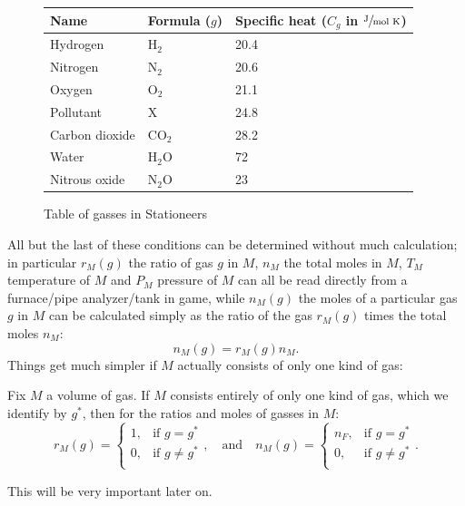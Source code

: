\documentclass{article}
\newcommand{\Hyd}{\mathrm{H}_2}
\newcommand{\Nit}{\mathrm{N}_2}
\newcommand{\Ox}{\mathrm{O}_2}
\newcommand{\Pol}{\mathrm{X}}
\newcommand{\CDiox}{\mathrm{CO}_2}
\newcommand{\Water}{\mathrm{H}_2\mathrm{O}}
\newcommand{\NiOx}{\mathrm{N}_2\mathrm{O}}
\begin{document}
\begin{figure}
    \begin{center}
        \begin{tabular}{*3l}
            \toprule
            Name & Formula ($g$) & Specific heat ($C_g$ in $\sfrac{\text{J}}{\text{mol K}}$) \\
            \midrule
            Hydrogen & $\Hyd$ & 20.4 \\
            Nitrogen & $\Nit$ & 20.6 \\
            Oxygen & $\Ox$ & 21.1 \\
            Pollutant & $\Pol$ & 24.8 \\
            Carbon dioxide & $\CDiox$ & 28.2 \\
            Water & $\Water$ & 72 \\
            Nitrous oxide & $\NiOx$ & 23 \\
            \bottomrule
        \end{tabular}
    \end{center}
    \caption{Table of gasses in Stationeers}
    \label{fig:gas-table}
\end{figure}

All but the last of these conditions can be determined without much calculation; in particular
$r_M(g)$ the ratio of gas $g$ in $M$, $n_M$ the total moles in $M$, $T_M$ temperature of $M$ and
$P_M$ pressure of $M$ can all be read directly from a furnace/pipe analyzer/tank in game, while
$n_M(g)$ the moles of a particular gas $g$ in $M$ can be calculated simply as the ratio of the gas
$r_M(g)$ times the total moles $n_M$:
\[
    n_M(g) = r_M(g)n_M.
\]
Things get much simpler if $M$ actually consists of only one kind of gas:
\begin{definition}
    Fix $M$ a volume of gas.
    If $M$ consists entirely of only one kind of gas, which we identify by $g^*$, then for the
    ratios and moles of gasses in $M$:
    \[
        r_M(g) = \begin{cases}
            1, & \text{if } g = g^* \\
            0, & \text{if } g \ne g^* \\
        \end{cases},
        \quad \text{and} \quad
        n_M(g) = \begin{cases}
            n_F, & \text{if } g = g^* \\
            0,   & \text{if } g \ne g^* \\
        \end{cases}.
    \]
\end{definition}
This will be very important later on.
\end{document}
